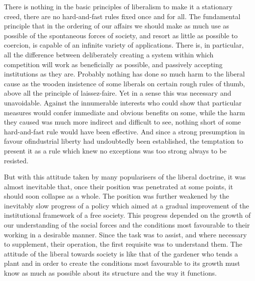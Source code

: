 \documentclass[11pt,openany]{book}
\begin{document}
\begin{center}\textasteriskcentered\hspace{0.9em}\textasteriskcentered\hspace{0.9em}\textasteriskcentered\end{center}

\begin{center}\textasteriskcentered\hspace{0.9em}\textasteriskcentered\hspace{0.9em}\textasteriskcentered\end{center}

There is nothing in the basic principles of liberalism to make it a stationary creed, there are no hard-and-fast rules fixed once and for all. The fundamental principle that in the ordering of our affairs we should make as much use as possible of the spontaneous forces of society, and resort as little as possible to coercion, is capable of an infinite variety of applications. There is, in particular, all the difference between deliberately creating a system within which competition will work as beneficially as possible, and passively accepting institutions as they are. Probably nothing has done so much harm to the liberal cause as the wooden insistence of some liberals on certain rough rules of thumb, above all the principle of laissez-faire. Yet in a sense this was necessary and unavoidable. Against the innumerable interests who could show that particular measures would confer immediate and obvious benefits on some, while the harm they caused was much more indirect and difficult to see, nothing short of some hard-and-fast rule would have been effective. And since a strong presumption in favour ofindustrial liberty had undoubtedly been established, the temptation to present it as a rule which knew no exceptions was too strong always to be resisted.

But with this attitude taken by many popularisers of the liberal doctrine, it was almost inevitable that, once their position was penetrated at some points, it should soon collapse as a whole. The position was further weakened by the inevitably slow progress of a policy which aimed at a gradual improvement of the institutional framework of a free society. This progress depended on the growth of our understanding of the social forces and the conditions most favourable to their working in a desirable manner. Since the task was to assist, and where necessary to supplement, their operation, the first requisite was to understand them. The attitude of the liberal towards society is like that of the gardener who tends a plant and in order to create the conditions most favourable to its growth must know as much as possible about its structure and the way it functions.
\end{document}
